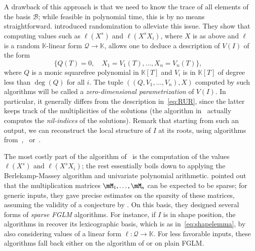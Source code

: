 \documentclass[final,1p,times,authoryear]{elsarticle}
\newcommand{\basis}{\mathscr{B}}
\newcommand{\lf}{X}
\newcommand{\residueI}{\mathscr{Q}}
\newcommand{\sqfree}{Q}
\def\K{\mathbb{K}}
\def\K {\ensuremath{\mathbb{K}}}
\begin{document}
A drawback of this approach is that we need to know the trace of all
elements of the basis $\basis$; while feasible in polynomial time,
this is by no means straightforward. \citet{BoSaSc03}
introduced randomization to alleviate this issue. They show
that computing values such as $\ell(\lf^s)$ and $\ell(\lf^s X_i)$, where
$\lf$ is as above and 
$\ell$ is a random $\K$-linear form $\residueI \to \K$, allows one to deduce
a description of $V(I)$ of the form
\begin{equation}\label{eq:BoSaSc03}
  \{  \sqfree(T)=0, \quad X_1 = V_1(T), \dots,X_n = V_n(T) \},
\end{equation}
where $\sqfree$ is a monic squarefree polynomial in $\K[T]$ and $V_i$ is in
$\K[T]$ of degree less than $\deg(\sqfree)$ for all $i$. The tuple
$((\sqfree,V_1,\dots,V_n),\lf)$ computed by  such algorithms
will be called a {\em zero-dimensional parametrization} of $V(I)$. In
particular, it generally differs from the description
in~\cref{eq:RUR}, since the latter keeps track of the multiplicities
of the solutions (the algorithm in~\citep{BoSaSc03} actually computes
the {\em nil-indices} of the solutions). Remark that starting from
such an output, we can reconstruct the local structure of $I$ at 
its roots, using algorithms from~\citep{MaMoMo96},~\citep{Mourrain97} or~\citep{NeRaSc17}.

The most costly part of the algorithm of~\citep{BoSaSc03} is the
computation of the values $\ell(\lf^s)$ and $\ell(\lf^s X_i)$; the
rest essentially boils down to applying the Berlekamp-Massey algorithm
and univariate polynomial arithmetic. \citet{FaMo17} pointed out that the
multiplication matrices
$\mM_1,\dots,\mM_n$ can be expected to be sparse; for generic inputs,
they gave precise estimates on the sparsity of these matrices,
assuming the validity of a conjecture by
\citet{MorenoSocias91}.  On this basis, they designed
several forms of {\em sparse FGLM} algorithms. For instance, if $I$ is
in shape position, the algorithms in \citep{FaMo17} recover its
lexicographic basis, which is as in~\eqref{eq:shapelemma}, by also
considering values of a linear form $\ell:\residueI \to \K$. For less
favorable inputs, these algorithms fall back either on the
algorithm of \citet{Sakata90} or on plain FGLM.
\end{document}
